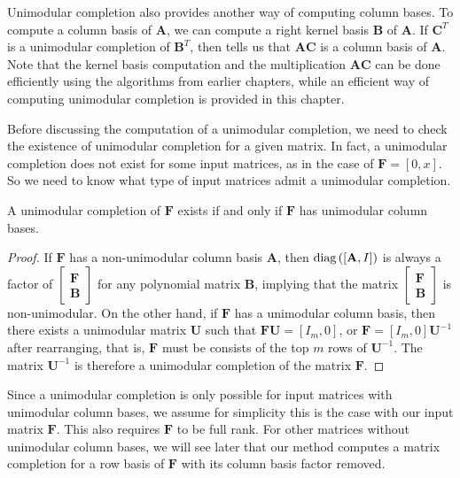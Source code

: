 Unimodular completion also provides another way of computing column
bases. To compute a column basis of $\mathbf{A}$, we can compute
a right kernel basis $\mathbf{B}$ of $\mathbf{A}$. If $\mathbf{C}^{T}$
is a unimodular completion of $\mathbf{B}^{T}$, then 
tells us that $\mathbf{A}\mathbf{C}$ is a column basis of $\mathbf{A}$.
Note that the kernel basis computation and the multiplication $\mathbf{AC}$
can be done efficiently using the algorithms from earlier chapters,
while an efficient way of computing unimodular completion is provided
in this chapter.

Before discussing the computation of a unimodular completion, we need
to check the existence of unimodular completion for a given matrix.
In fact, a unimodular completion does not exist for some input matrices,
as in the case of $\mathbf{F}=\left[0,x\right]$. So we need to know
what type of input matrices admit a unimodular completion.
\begin{lem}
\label{lem:unimodularCompletionCondition}A unimodular completion
of $\mathbf{F}$ exists if and only if $\mathbf{F}$ has unimodular
column bases. \end{lem}
\begin{proof}
If $\mathbf{F}$ has a non-unimodular column basis $\mathbf{A}$,
then $\mbox{diag}\left(\left[\mathbf{A},I\right]\right)$ is always a factor
of $\begin{bmatrix}\mathbf{F}\\
\mathbf{B}
\end{bmatrix}$ for any polynomial matrix $\mathbf{B}$, implying that the matrix
$\begin{bmatrix}\mathbf{F}\\
\mathbf{B}
\end{bmatrix}$ is non-unimodular. On the other hand, if $\mathbf{F}$ has a unimodular
column basis, then there exists a unimodular matrix $\mathbf{U}$
such that $\mathbf{F}\mathbf{U}=\left[I_{m},0\right]$, or $\mathbf{F}=\left[I_{m},0\right]\mathbf{U}^{-1}$
after rearranging, that is, $\mathbf{F}$ must be consists of the
top $m$ rows of $\mathbf{U}^{-1}$. The matrix $\mathbf{U}^{-1}$
is therefore a unimodular completion of the matrix $\mathbf{F}$.
\end{proof}
Since a unimodular completion is only possible for input matrices
with unimodular column bases, we assume for simplicity this is the
case with our input matrix $\mathbf{F}$. This also requires $\mathbf{F}$
to be full rank. For other matrices without unimodular column bases,
we will see later that our method computes a matrix completion for
a row basis of $\mathbf{F}$ with its column basis factor removed.

